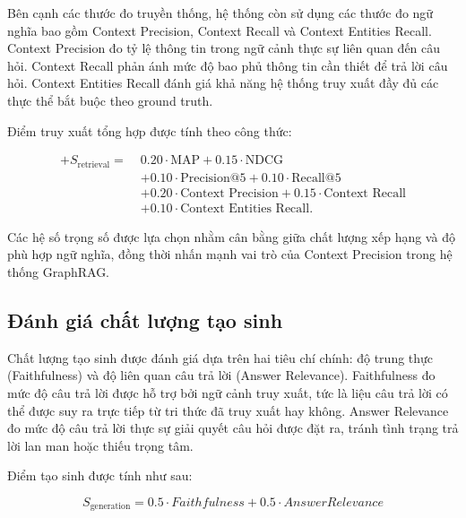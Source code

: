 Bên cạnh các thước đo truyền thống, hệ thống còn sử dụng các thước đo ngữ nghĩa bao gồm Context Precision, Context Recall và Context Entities Recall. Context Precision đo tỷ lệ thông tin trong ngữ cảnh thực sự liên quan đến câu hỏi. Context Recall phản ánh mức độ bao phủ thông tin cần thiết để trả lời câu hỏi. Context Entities Recall đánh giá khả năng hệ thống truy xuất đầy đủ các thực thể bắt buộc theo ground truth.

Điểm truy xuất tổng hợp được tính theo công thức:

\begin{equation}
\begin{aligned}












+
S_{\text{retrieval}} =\;& 0.20 \cdot \text{MAP} 
+ 0.15 \cdot \text{NDCG} \\
& + 0.10 \cdot \text{Precision@5}
+ 0.10 \cdot \text{Recall@5} \\
& + 0.20 \cdot \text{Context Precision}
+ 0.15 \cdot \text{Context Recall} \\
& + 0.10 \cdot \text{Context Entities Recall}.
\end{aligned}
\end{equation}

Các hệ số trọng số được lựa chọn nhằm cân bằng giữa chất lượng xếp hạng và độ phù hợp ngữ nghĩa, đồng thời nhấn mạnh vai trò của Context Precision trong hệ thống GraphRAG.

\subsection{Đánh giá chất lượng tạo sinh}

Chất lượng tạo sinh được đánh giá dựa trên hai tiêu chí chính: độ trung thực (Faithfulness) và độ liên quan câu trả lời (Answer Relevance). Faithfulness đo mức độ câu trả lời được hỗ trợ bởi ngữ cảnh truy xuất, tức là liệu câu trả lời có thể được suy ra trực tiếp từ tri thức đã truy xuất hay không. Answer Relevance đo mức độ câu trả lời thực sự giải quyết câu hỏi được đặt ra, tránh tình trạng trả lời lan man hoặc thiếu trọng tâm.

Điểm tạo sinh được tính như sau:

\begin{equation}
S_{\text{generation}} =
0.5 \cdot Faithfulness +
0.5 \cdot AnswerRelevance
\end{equation}

